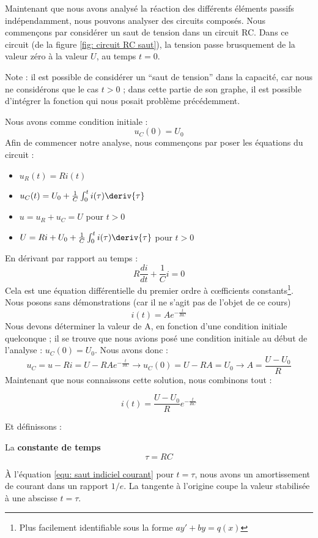\documentclass[12pt,a4paper]{article}
\begin{document}
Maintenant que nous avons analysé la réaction des différents éléments passifs indépendamment, nous pouvons analyser des circuits composés. Nous commençons par considérer un saut de tension dans un circuit RC. Dans ce circuit (de la figure \ref{fig: circuit RC saut}), la tension passe brusquement de la valeur zéro à la valeur $U$, au temps $t=0$. 
\begin{blackbox}
	Note : il est possible de considérer un ``saut de tension'' dans la capacité, car nous ne considérons que le cas $t>0$ ; dans cette partie de son graphe, il est possible d'intégrer la fonction qui nous posait problème précédemment.
\end{blackbox}
Nous avons comme condition initiale : 
\[u_C(0) = U_0\]
Afin de commencer notre analyse, nous commençons par poser les équations du circuit :
\begin{itemize}
	\item 	$u_R(t) = Ri(t)$
	\item 	$u_C(t) = U_0 + \frac{1}{C}\int_0^t i(\tau) \deriv{\tau}$
	\item 	$u = u_R + u_C = U$ pour $t>0$
	\item 	$U = Ri + U_0 + \frac{1}{C}\int_0^t i(\tau)\deriv{\tau}$ pour $t>0$
\end{itemize}
En dérivant par rapport au temps :
\[R\frac{di}{dt} + \frac{1}{C}i = 0\]
Cela est une équation différentielle du premier ordre à c\oe fficients constants\footnote{Plus facilement identifiable sous la forme $ay' + by = q(x)$}. Nous posons sans démonstrations (car il ne s'agit pas de l'objet de ce cours) 
\[i(t) = Ae^{-\frac{t}{RC}}\]
Nous devons déterminer la valeur de A, en fonction d'une condition initiale quelconque ; il se trouve que nous avions posé une condition initiale au début de l'analyse : $u_C(0) = U_0$. Nous avons donc :
\begin{equation}
	u_C = u-Ri = U-RAe^{-\frac{t}{RC}} \to u_C(0) = U-RA = U_0 \to A = \frac{U-U_0}{R}
\end{equation}
Maintenant que nous connaissons cette solution, nous combinons tout :
\begin{boite}[0.75]
	\begin{equation}
		i(t) = \frac{U-U_0}{R}e^{-\frac{t}{RC}}
		\label{equ: saut indiciel courant}
	\end{equation}
\end{boite}
Et définissons :
\begin{boite}
	La \textbf{constante de temps}
	\[\tau = RC\]
\end{boite}
À l'équation  \ref{equ: saut indiciel courant} pour $t=\tau$, nous avons un amortissement de courant dans un rapport $1/e$. La tangente à l'origine coupe la valeur stabilisée à une abscisse $t=\tau$.
\end{document}
